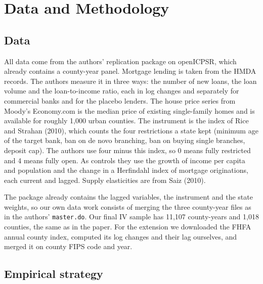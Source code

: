 \documentclass[12pt,a4paper]{article}
\begin{document}
\section{Data and Methodology}

\subsection{Data}

All data come from the authors' replication package on openICPSR, which already contains a county-year panel. Mortgage lending is taken from the HMDA records. The authors measure it in three ways: the number of new loans, the loan volume and the loan-to-income ratio, each in log changes and separately for commercial banks and for the placebo lenders. The house price series from Moody's Economy.com is the median price of existing single-family homes and is available for roughly 1,000 urban counties. The instrument is the index of Rice and Strahan (2010), which counts the four restrictions a state kept (minimum age of the target bank, ban on de novo branching, ban on buying single branches, deposit cap). The authors use four minus this index, so 0 means fully restricted and 4 means fully open. As controls they use the growth of income per capita and population and the change in a Herfindahl index of mortgage originations, each current and lagged. Supply elasticities are from Saiz (2010).

The package already contains the lagged variables, the instrument and the state weights, so our own data work consists of merging the three county-year files as in the authors' \texttt{master.do}. Our final IV sample has 11,107 county-years and 1,018 counties, the same as in the paper. For the extension we downloaded the FHFA annual county index, computed its log changes and their lag ourselves, and merged it on county FIPS code and year.

\subsection{Empirical strategy}
\end{document}
